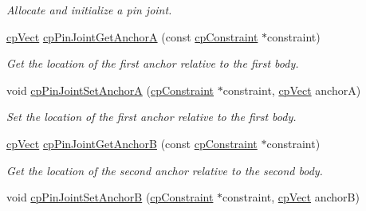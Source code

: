 \begin{DoxyCompactItemize}
\begin{DoxyCompactList}\small\item\em Allocate and initialize a pin joint. \end{DoxyCompactList}\item 
\hypertarget{group__cp_pin_joint_gac0fa093c3d26e95c4d1e728d00d29378}{}\hyperlink{structcp_vect}{cp\+Vect} \hyperlink{group__cp_pin_joint_gac0fa093c3d26e95c4d1e728d00d29378}{cp\+Pin\+Joint\+Get\+Anchor\+A} (const \hyperlink{structcp_constraint}{cp\+Constraint} $\ast$constraint)\label{group__cp_pin_joint_gac0fa093c3d26e95c4d1e728d00d29378}

\begin{DoxyCompactList}\small\item\em Get the location of the first anchor relative to the first body. \end{DoxyCompactList}\item 
\hypertarget{group__cp_pin_joint_gaec992115ee39b135d8c4ed1daa4226bf}{}void \hyperlink{group__cp_pin_joint_gaec992115ee39b135d8c4ed1daa4226bf}{cp\+Pin\+Joint\+Set\+Anchor\+A} (\hyperlink{structcp_constraint}{cp\+Constraint} $\ast$constraint, \hyperlink{structcp_vect}{cp\+Vect} anchor\+A)\label{group__cp_pin_joint_gaec992115ee39b135d8c4ed1daa4226bf}

\begin{DoxyCompactList}\small\item\em Set the location of the first anchor relative to the first body. \end{DoxyCompactList}\item 
\hypertarget{group__cp_pin_joint_gac4d94a3a6e6a8e20838b6ceb60c474fc}{}\hyperlink{structcp_vect}{cp\+Vect} \hyperlink{group__cp_pin_joint_gac4d94a3a6e6a8e20838b6ceb60c474fc}{cp\+Pin\+Joint\+Get\+Anchor\+B} (const \hyperlink{structcp_constraint}{cp\+Constraint} $\ast$constraint)\label{group__cp_pin_joint_gac4d94a3a6e6a8e20838b6ceb60c474fc}

\begin{DoxyCompactList}\small\item\em Get the location of the second anchor relative to the second body. \end{DoxyCompactList}\item 
\hypertarget{group__cp_pin_joint_ga6c9a5505613f3b310b07e06d879c8020}{}void \hyperlink{group__cp_pin_joint_ga6c9a5505613f3b310b07e06d879c8020}{cp\+Pin\+Joint\+Set\+Anchor\+B} (\hyperlink{structcp_constraint}{cp\+Constraint} $\ast$constraint, \hyperlink{structcp_vect}{cp\+Vect} anchor\+B)\label{group__cp_pin_joint_ga6c9a5505613f3b310b07e06d879c8020}


\end{DoxyCompactItemize}
